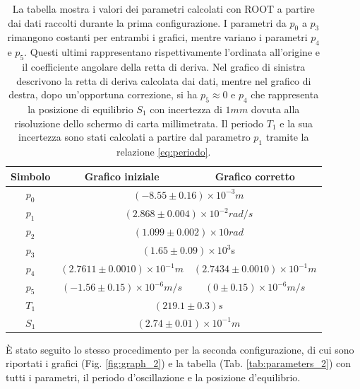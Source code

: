 \documentclass{article}
\begin{document}
\begin{table}[ht!]
    \centering
    \begin{tabular}{|c|c|c|}
        \hline
        Simbolo & Grafico iniziale & Grafico corretto \\
        \hline
        $p_0$ & \multicolumn{2}{c|}{$(-8.55 \pm 0.16)\times10^{-3}m$}\\
        \hline
        $p_1$ & \multicolumn{2}{c|}{$(2.868 \pm 0.004)\times10^{-2}rad/s$}\\
        \hline
        $p_2$ & \multicolumn{2}{c|}{$(1.099 \pm 0.002)\times10rad$}\\
        \hline
        $p_3$ & \multicolumn{2}{c|}{$(1.65 \pm 0.09)\times10^{3}$s}\\
        \hline
        $p_4$ & $(2.7611 \pm 0.0010)\times10^{-1}m$& $(2.7434 \pm 0.0010)\times10^{-1}m$ \\
        \hline
        $p_5$ & $(-1.56 \pm 0.15)\times10^{-6}m/s$ & $(0 \pm 0.15)\times10^{-6}m/s$\\
        \hline
        \hline
        $T_1$ & \multicolumn{2}{c|}{$(219.1 \pm 0.3)s$}\\
        \hline
        $S_1$ & \multicolumn{2}{c|}{$(2.74 \pm 0.01)\times10^{-1}m$}\\
        \hline
    \end{tabular}
    \caption{La tabella mostra i valori dei parametri calcolati con ROOT a partire dai dati raccolti durante la prima configurazione. I parametri da $p_0$ a $p_3$ rimangono costanti per entrambi i grafici, mentre variano i parametri $p_4$ e $p_5$. Questi ultimi rappresentano rispettivamente l'ordinata all'origine e il coefficiente angolare della retta di deriva. Nel grafico di sinistra descrivono la retta di deriva calcolata dai dati, mentre nel grafico di destra, dopo un'opportuna correzione, si ha $p_5 \approx 0$ e $p_4$ che rappresenta la posizione di equilibrio $S_1$ con incertezza di $1mm$ dovuta alla risoluzione dello schermo di carta millimetrata. Il periodo $T_1$ e la sua incertezza sono stati calcolati a partire dal parametro $p_1$ tramite la relazione \eqref{eq:periodo}.}
    \label{tab:parameters_1}
\end{table}

È stato seguito lo stesso procedimento per la seconda configurazione, di cui sono riportati i grafici (Fig. \ref{fig:graph_2}) e la tabella (Tab. \ref{tab:parameters_2}) con tutti i parametri, il periodo d'oscillazione e la posizione d'equilibrio.
 
\end{document}
